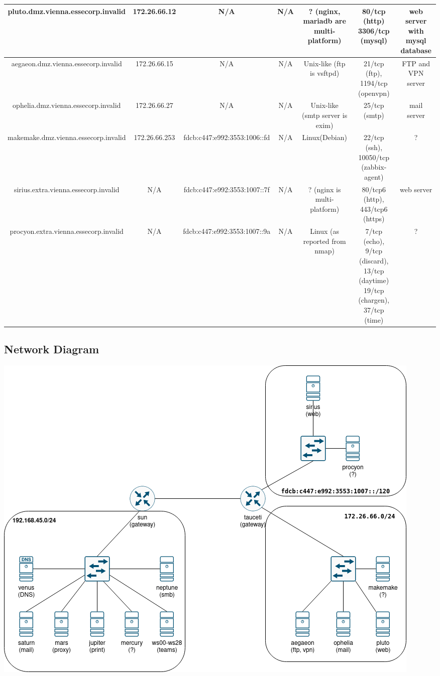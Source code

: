 \begin{center}
{\begin{tabular}{| c | c | c | c | c | c | c |}
        \hline
        pluto.dmz.vienna.essecorp.invalid       & 172.26.66.12   & N/A & N/A & ? (nginx, mariadb are multi-platform) & 80/tcp (http) 3306/tcp (mysql) & web server with mysql database \\
        \hline
        aegaeon.dmz.vienna.essecorp.invalid     & 172.26.66.15   & N/A & N/A & Unix-like (ftp is vsftpd) & 21/tcp (ftp), 1194/tcp (openvpn) & FTP and VPN server \\
        \hline
        ophelia.dmz.vienna.essecorp.invalid     & 172.26.66.27   & N/A & N/A & Unix-like (smtp server is exim) & 25/tcp (smtp) & mail server \\
        \hline
        makemake.dmz.vienna.essecorp.invalid    & 172.26.66.253  & fdcb:c447:e992:3553:1006::fd & N/A & Linux(Debian) & 22/tcp (ssh), 10050/tcp (zabbix-agent) & ? \\
        \hline
        sirius.extra.vienna.essecorp.invalid    & N/A & fdcb:c447:e992:3553:1007::7f & N/A & ? (nginx is multi-platform) & 80/tcp6 (http), 443/tcp6 (https) & web server \\
        \hline
        procyon.extra.vienna.essecorp.invalid   & N/A & fdcb:c447:e992:3553:1007::9a & N/A & Linux (as reported from nmap) & 7/tcp (echo), 9/tcp (discard), 13/tcp (daytime) 19/tcp (chargen), 37/tcp (time) & ? \\
        \hline
    \end{tabular}
    }
\end{center}

\subsection{Network Diagram}
\includegraphics[scale=0.6]{imgs/sse-netscan.png}
